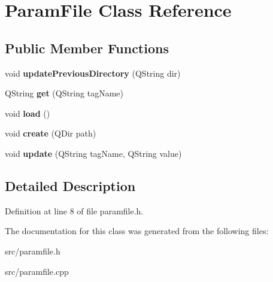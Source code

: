 \hypertarget{class_param_file}{}\section{Param\+File Class Reference}
\label{class_param_file}
\subsection*{Public Member Functions}
\begin{DoxyCompactItemize}
\item 
\hypertarget{class_param_file_a161af51d06ed58444b0de69f05215692}{}void {\bfseries update\+Previous\+Directory} (Q\+String dir)\label{class_param_file_a161af51d06ed58444b0de69f05215692}

\item 
\hypertarget{class_param_file_a3ea5e819ddbaffce3e817ea9a605f08a}{}Q\+String {\bfseries get} (Q\+String tag\+Name)\label{class_param_file_a3ea5e819ddbaffce3e817ea9a605f08a}

\item 
\hypertarget{class_param_file_a02ec327dc82b36bb00aa2627c7bc6695}{}void {\bfseries load} ()\label{class_param_file_a02ec327dc82b36bb00aa2627c7bc6695}

\item 
\hypertarget{class_param_file_a6297be1bf495edce7fcb410c0fa3c702}{}void {\bfseries create} (Q\+Dir path)\label{class_param_file_a6297be1bf495edce7fcb410c0fa3c702}

\item 
\hypertarget{class_param_file_ac36c80004ee4b479363ff885256b10e2}{}void {\bfseries update} (Q\+String tag\+Name, Q\+String value)\label{class_param_file_ac36c80004ee4b479363ff885256b10e2}

\end{DoxyCompactItemize}


\subsection{Detailed Description}


Definition at line 8 of file paramfile.\+h.



The documentation for this class was generated from the following files\+:\begin{DoxyCompactItemize}
\item 
src/paramfile.\+h\item 
src/paramfile.\+cpp\end{DoxyCompactItemize}

